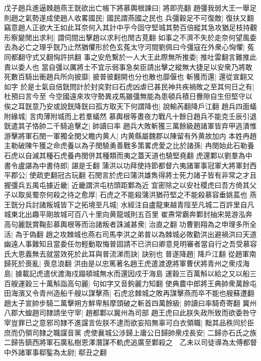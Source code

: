 戊子趙兵進逼棘趙燕王皝欲出亡帳下將慕輿根諫曰|{
	將即亮翻}
趙彊我弱大王一舉足則趙之氣勢遂成使趙人收畧國民|{
	國民謂燕國之民也}
兵彊穀足不可復敵|{
	復扶又翻}
竊意趙人正欲大王如此耳奈何入其計中乎今固守堅城其勢百倍縱其急攻猶足枝持觀形察變閒出求利|{
	謂伺間出擊趙以求利也閒古莧翻}
如事之不濟不失於走奈何望風委去為必亡之理乎皝乃止然猶懼形於色玄菟太守河間劉佩曰今彊寇在外衆心恟懼|{
	菟同都翻守式又翻恟許拱翻}
事之安危繫於一人大王此際無所推委|{
	推吐雷翻言難推此責以委人也}
當自彊以厲將士不宜示弱事急矣臣請出擊之縱無大捷足以安衆乃將敢死數百騎出衝趙兵所向披靡|{
	披普彼翻開也分也散也靡偃也}
斬獲而還|{
	還從宣翻又如字}
於是士氣自倍皝問計於封奕對曰石虎凶虐已甚民神共疾禍敗之至其何日之有|{
	杜預曰言今至}
今空國遠來攻守勢異戎馬雖彊無能為患頓兵積日釁隙自生但堅守以俟之耳皝意乃安或說皝降皝曰孤方取天下何謂降也|{
	說輸芮翻降戶江翻}
趙兵四面蟻附緣城|{
	言肉薄附城而上若羣蟻然}
慕輿根等晝夜力戰凡十餘日趙兵不能克壬辰引退皝遣其子恪帥二千騎追擊之|{
	帥讀曰率}
趙兵大敗斬獲三萬餘級趙諸軍皆弃甲逃潰惟游擊將軍石閔一軍獨全閔父瞻内黄人|{
	内黄縣屬魏郡以陳留有外黄故加内}
本姓冉趙主勒破陳午獲之命虎養以為子閔驍勇善戰多策畧虎愛之比於諸孫|{
	冉閔始此石勒養石虎以自滅其種石虎養冉閔併其種類而夷之蓋天道也驍堅堯翻}
虎還鄴以劉羣為中書令盧諶為中書侍郎|{
	諶是壬翻}
蒲洪以功拜使持節都督六夷諸軍事冠軍大將軍封西平郡公|{
	使疏吏翻冠古玩翻}
石閔言於虎曰蒲洪雄雋得將士死力諸子皆有非常之才且握彊兵五禺屯據近畿|{
	近畿謂洪屯枋頭距鄴為近}
宜密除之以安社稷虎曰吾方倚其父子以取吳蜀奈何殺之待之愈厚|{
	石虎之不能殺蒲洪猶苻堅之不能殺慕容垂姚萇也}
燕王皝分兵討諸叛城皆下之拓境至凡城|{
	水經注自盧龍東越青陘至凡城二百許里自凡城東北出趣平剛故城可百八十里向黄龍城則五百里}
崔燾常霸奔鄴封抽宋晃游泓奔高句麗皝賞鞠彭慕輿根等而治諸叛者誅滅甚衆|{
	治直之翻}
功曹劉翔為之申理多所全活|{
	為于偽翻}
趙之攻棘城也燕右司馬李洪之弟普以為棘城必敗勸洪出避禍洪曰天道幽遠人事難知且當委任勿輕動取悔普固請不已洪曰卿意見明審者當自行之吾受慕容氏大恩義無去就當效死於此耳與普流涕而訣|{
	訣别也}
普遂降趙|{
	降戶江翻}
從趙軍南歸死於喪亂|{
	喪息浪翻}
洪由是以忠篤著名趙王虎遣渡遼將軍曹伏將青州之衆戍海島|{
	據載記虎遣伏渡海戍蹋頓城無水而還因戍于海島}
運穀三百萬斛以給之又以船三百艘運穀三十萬斛詣高句麗|{
	句如字又音鉤麗力知翻}
使典農中郎將王典帥衆萬餘屯田海濱又令青州造船千艘以謀擊燕|{
	石虎忿棘城之敗再謀擊燕而卒不能也艘蘇遭翻}
趙太子宣帥步騎二萬擊朔方鮮卑斛摩頭破之斬首四萬餘級|{
	帥讀曰率騎奇寄翻}
冀州八郡大蝗趙司隸請坐守宰|{
	趙都鄴以冀州為司部}
趙王虎曰此朕失政所致而欲委咎守宰豈罪已之意邪司隸不進讜言佐朕不逮而欲妄陷無辜可白衣領職|{
	黜其品秩同於臣庶而仍領司隸之職讜音黨}
虎使襄城公涉歸上庸公日歸帥衆戍長安|{
	二歸亦石氏之族}
二歸告鎮西將軍石廣私樹恩澤潛謀不軌虎追廣至鄴殺之　乙未以司徒導為太傅都督中外諸軍事郗鍳為太尉|{
	郗丑之翻}
